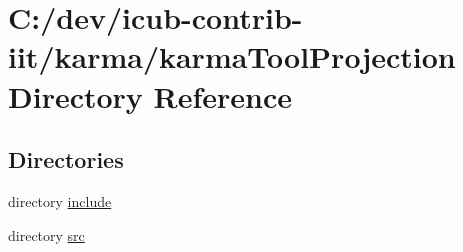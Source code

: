 \section{C\+:/dev/icub-\/contrib-\/iit/karma/karma\+Tool\+Projection Directory Reference}
\label{dir_275393e7f6134d93bce2b0a063ebc9fd}
\subsection*{Directories}
\begin{DoxyCompactItemize}
\item 
directory \hyperlink{dir_e5f4742aadeb5fda1edcc8b135fd66d1}{include}
\item 
directory \hyperlink{dir_f9805a429fa21d3d8fbea8a1c16643a5}{src}
\end{DoxyCompactItemize}
